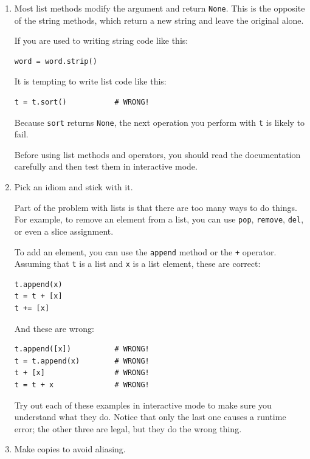\documentclass[10pt]{book}
\begin{document}
\begin{enumerate}

\item Most list methods modify the argument and
  return {\tt None}.  This is the opposite of the string methods,
  which return a new string and leave the original alone.

If you are used to writing string code like this:

\begin{verbatim}
word = word.strip()
\end{verbatim}

It is tempting to write list code like this:

\begin{verbatim}
t = t.sort()           # WRONG!
\end{verbatim}

Because {\tt sort} returns {\tt None}, the
next operation you perform with {\tt t} is likely to fail.

Before using list methods and operators, you should read the
documentation carefully and then test them in interactive mode.

\item Pick an idiom and stick with it.

Part of the problem with lists is that there are too many
ways to do things.  For example, to remove an element from
a list, you can use {\tt pop}, {\tt remove}, {\tt del},
or even a slice assignment.

To add an element, you can use the {\tt append} method or
the {\tt +} operator.  Assuming that {\tt t} is a list and
{\tt x} is a list element, these are correct: 

\begin{verbatim}
t.append(x)
t = t + [x]
t += [x]
\end{verbatim}

And these are wrong:

\begin{verbatim}
t.append([x])          # WRONG!
t = t.append(x)        # WRONG!
t + [x]                # WRONG!
t = t + x              # WRONG!
\end{verbatim}

Try out each of these examples in interactive mode to make sure
you understand what they do.  Notice that only the last
one causes a runtime error; the other three are legal, but they
do the wrong thing.


\item Make copies to avoid aliasing.


\end{enumerate}
\end{document}
